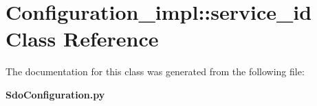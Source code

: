 \section{Configuration\_\-impl::service\_\-id Class Reference}
\label{classConfiguration__impl_1_1service__id}


The documentation for this class was generated from the following file:\begin{CompactItemize}
\item 
{\bf Sdo\-Configuration.py}\end{CompactItemize}

